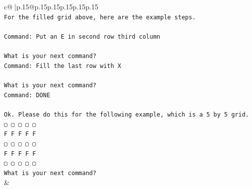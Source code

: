 \documentclass{article}
\begin{document}
{\begin{supertabular}{c@{$\;$}|p{.15\linewidth}@{}p{.15\linewidth}p{.15\linewidth}p{.15\linewidth}p{.15\linewidth}p{.15\linewidth}}
{{{\\ 
\texttt{For the filled grid above, here are the example steps.} \\
\\ 
\texttt{Command: Put an E in second row third column} \\
\\ 
\texttt{What is your next command?} \\
\texttt{Command: Fill the last row with X} \\
\\ 
\texttt{What is your next command?} \\
\texttt{Command: DONE} \\
\\ 
\texttt{Ok. Please do this for the following example, which is a 5 by 5 grid.} \\
\texttt{▢ ▢ ▢ ▢ ▢} \\
\texttt{F F F F F} \\
\texttt{▢ ▢ ▢ ▢ ▢} \\
\texttt{F F F F F} \\
\texttt{▢ ▢ ▢ ▢ ▢} \\
\texttt{What is your next command?} \\
            }
        }
    }
    & \\ \\


\end{supertabular}}
\end{document}

